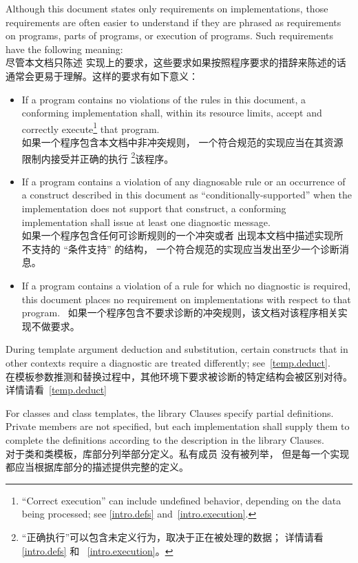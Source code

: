 \pnum
{}%
Although this document states only requirements on \Cpp{}
implementations, those requirements are often easier to understand if
they are phrased as requirements on programs, parts of programs, or
execution of programs. Such requirements have the following meaning: \\
尽管本文档只陈述 \Cpp{} 实现上的要求，这些要求如果按照程序要求的措辞来陈述的话
通常会更易于理解。这样的要求有如下意义：
\begin{itemize}
\item
If a program contains no violations of the rules in this
document, a conforming implementation shall,
within its resource limits, accept and correctly execute\footnote{``Correct execution'' can include undefined behavior, depending on
the data being processed; see \ref{intro.defs} and~\ref{intro.execution}.}
that program. \\
如果一个程序包含本文档中非冲突规则，
一个符合规范的实现应当在其资源限制内接受并正确的执行
\footnote{
    ``正确执行''可以包含未定义行为，取决于正在被处理的数据；
    详情请看 \ref{intro.defs} 和 ~\ref{intro.execution}。
}该程序。
\item
{}%
If a program contains a violation of any diagnosable rule or an occurrence
of a construct described in this document as ``conditionally-supported'' when
the implementation does not support that construct, a conforming implementation
shall issue at least one diagnostic message. \\
如果一个程序包含任何可诊断规则的一个冲突或者
出现本文档中描述实现所不支持的 ``条件支持'' 的结构，
一个符合规范的实现应当发出至少一个诊断消息。
\item
{}%
If a program contains a violation of a rule for which no diagnostic
is required, this document places no requirement on
implementations with respect to that program. \
如果一个程序包含不要求诊断的冲突规则，该文档对该程序相关实现不做要求。
\end{itemize}
\begin{note}
During template argument deduction and substitution,
certain constructs that in other contexts require a diagnostic
are treated differently;
see~\ref{temp.deduct}. \\
在模板参数推测和替换过程中，其他环境下要求被诊断的特定结构会被区别对待。
详情请看~\ref{temp.deduct}
\end{note}

\pnum
{}%
%
%
For classes and class templates, the library Clauses specify partial
definitions. Private members\iref{class.access} are not
specified, but each implementation shall supply them to complete the
definitions according to the description in the library Clauses. \\
对于类和类模板，库部分列举部分定义。私有成员\iref{class.access} 没有被列举，
但是每一个实现都应当根据库部分的描述提供完整的定义。

